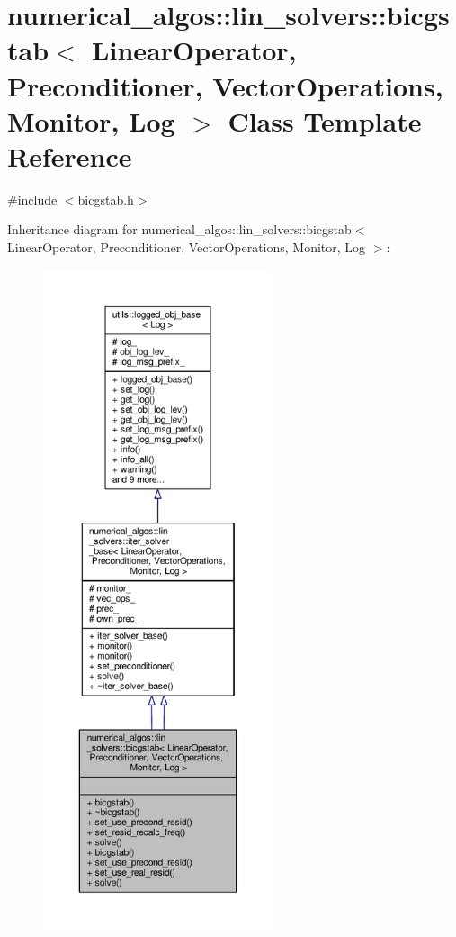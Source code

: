 \hypertarget{classnumerical__algos_1_1lin__solvers_1_1bicgstab}{\section{numerical\-\_\-algos\-:\-:lin\-\_\-solvers\-:\-:bicgstab$<$ Linear\-Operator, Preconditioner, Vector\-Operations, Monitor, Log $>$ Class Template Reference}
\label{classnumerical__algos_1_1lin__solvers_1_1bicgstab}
}


{\ttfamily \#include $<$bicgstab.\-h$>$}



Inheritance diagram for numerical\-\_\-algos\-:\-:lin\-\_\-solvers\-:\-:bicgstab$<$ Linear\-Operator, Preconditioner, Vector\-Operations, Monitor, Log $>$\-:\nopagebreak
\begin{figure}[H]
\begin{center}
\leavevmode
\includegraphics[height=550pt]{classnumerical__algos_1_1lin__solvers_1_1bicgstab__inherit__graph}
\end{center}
\end{figure}


